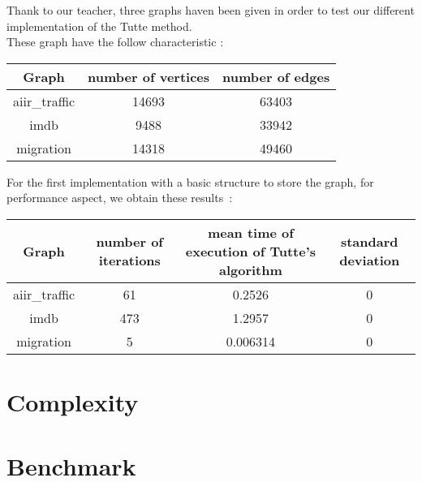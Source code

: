 
Thank to our teacher, three graphs haven been given in order to test our
different implementation of the Tutte method.\\

These graph have the follow characteristic :

\begin{center}
\begin{tabular}{|c|c|c|}
\hline
Graph & number of vertices & number of edges \\
\hline
aiir\_traffic & 14693 & 63403\\
imdb & 9488 & 33942\\
migration & 14318 & 49460\\
\hline
\end{tabular}
\end{center}


For the first implementation with a basic structure to
store the graph, for performance aspect, we obtain these results~:

\begin{center}
\begin{tabular}{|c|c|c|c|}
\hline
Graph & number of iterations & mean time of execution of Tutte's algorithm & standard deviation\\
\hline
aiir\_traffic & 61 & 0.2526 & 0\\
imdb & 473 & 1.2957 & 0\\
migration & 5 & 0.006314 & 0\\
\hline

\end{tabular}
\end{center}

\section{Complexity}
\section{Benchmark}
